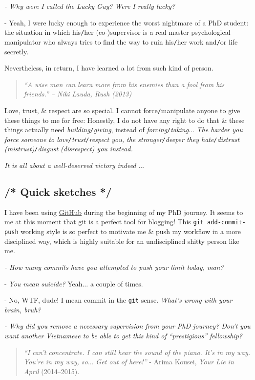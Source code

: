 \documentclass[12pt,twoside]{book}
\begin{document}
{\it - Why were I called the Lucky Guy? Were I really lucky?}

- Yeah, I were lucky enough to experience the worst nightmare of a PhD student: the situation in which his{\tt/}her (co-)supervisor is a real master psychological manipulator who always tries to find the way to ruin his{\tt/}her work and{\tt/}or life secretly.

Nevertheless, in return, I have learned a lot from such kind of person.

\begin{quote}\it
	``A wise man can learn more from his enemies than a fool from his friends.'' -- {\sc Niki Lauda}, Rush (2013)
\end{quote}
Love, trust, \& respect are so special. I cannot force{\tt/}manipulate anyone to give these things to me for free: Honestly, I do not have any right to do that \& these things actually need {\it building{\tt/}giving}, instead of {\it forcing{\tt/}taking}$\ldots$ {\it The harder you force someone to love{\tt/}trust{\tt/}respect you, the stronger{\tt/}deeper they hate{\tt/}distrust (mistrust){\tt/}disgust (disrespect) you instead.}

{\it It is all about a well-deserved victory indeed} $\ldots$

\subsection{{\color{gray}/* Quick sketches */}}
 I have been using \href{https://github.com}{GitHub} during the beginning of my PhD journey. It seems to me at this moment that \href{https://git-scm.com/}{git} is a perfect tool for blogging! This {\tt git add-commit-push} working style is so perfect to motivate me \& push my workflow in a more disciplined way, which is highly suitable for an undisciplined shitty person like me.

{\it - How many commits have you attempted to push your limit today, man?}

- {\it You mean suicide?} Yeah$\ldots$ a couple of times.

- No, WTF, dude! I mean commit in the {\tt git} sense. {\it What's wrong with your brain, bruh?}

{\it - Why did you remove a necessary supervision from your PhD journey? Don't you want another Vietnamese to be able to get this kind of ``prestigious'' fellowship?}

\begin{quote}
	{\it``I can't concentrate. I can still hear the sound of the piano. It's in my way. You're in my way, so$\ldots$ Get out of here!''} - Arima Kousei, {\it Your Lie in April}  (2014--2015).
\end{quote}
\end{document}
